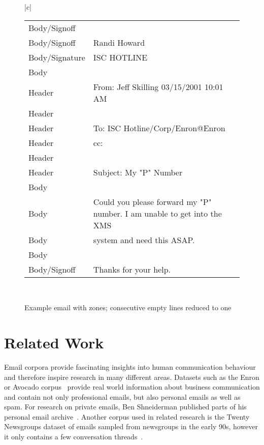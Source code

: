 \documentclass{llncs}
\begin{document}
\begin{figure}
\begin{tabular}{|c|}
{\begin{tabular*}{\textwidth}{l|l}
		Body/Signoff   & \\
		Body/Signoff   & Randi Howard\\
		Body/Signature & ISC HOTLINE\\
		Body           & \\\hline
		Header         & From:  Jeff Skilling                           03/15/2001 10:01 AM \\
		Header         & \\
		Header         & To: ISC Hotline/Corp/Enron@Enron\\
		Header         & cc:\\
		Header         & \\
		Header         & Subject: My "P" Number\\\hline
		Body           & \\
		Body           & Could you please forward my "P" number.  I am unable to get into the XMS \\
		Body           & system and need this ASAP.\\
		Body           & \\
		Body/Signoff   & Thanks for your help.\\
	\end{tabular*}
}
	\\ 
	\hline 
\end{tabular} 
\caption{Example email with zones; consecutive empty lines reduced to one}
\label{fig:examplemail}
\end{figure}





\section{Related Work}

Email corpora provide fascinating insights into human communication behaviour and therefore inspire research in many different areas.
Datasets such as the Enron or Avocado corpus~\cite{avocado,enron} provide real world information about business communication and contain not only professional emails, but also personal emails as well as spam.
For research on private emails, Ben Shneiderman published parts of his personal email archive~\cite{shneiderman}.
Another corpus used in related research is the Twenty Newsgroups dataset of emails sampled from newsgroups in the early 90s, however it only contains a few conversation threads~\cite{20news}.
\end{document}
